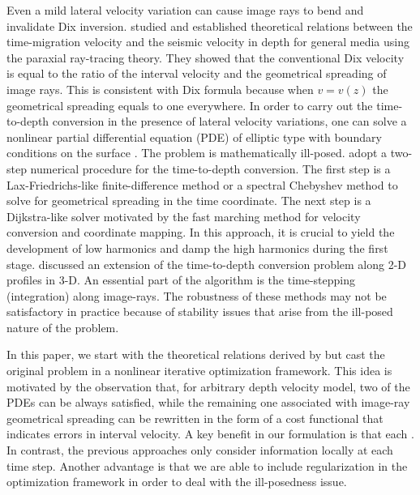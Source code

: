 Even a mild lateral velocity variation can cause image rays to bend and invalidate Dix inversion. 
\cite{cameron1,cameron2} studied and established theoretical relations between the time-migration velocity and the 
seismic velocity in depth for general media using the paraxial ray-tracing theory. They showed 
that\old{,} the conventional Dix velocity is equal to the ratio of the interval velocity and the 
geometrical spreading of image rays. This is consistent with Dix formula because when $v = v(z)$ the geometrical 
spreading equals to one everywhere. In order to carry out the time-to-depth conversion in the presence of lateral 
velocity variations, one can solve a nonlinear partial differential equation 
(PDE) of elliptic type with boundary conditions on the surface \cite[]{cameron3}. The problem is mathematically 
ill-posed. \cite{cameron3} adopt a two-step numerical procedure for the time-to-depth conversion. The first step 
is a Lax-Friedrichs-like finite-difference method or a spectral 
Chebyshev method to solve for geometrical spreading in the time coordinate. The next step is a Dijkstra-like solver 
motivated by the fast marching method \cite[]{sethian} for velocity conversion and coordinate mapping. In this 
approach, it is crucial to yield the development of low harmonics and damp the high harmonics during the first 
stage. \cite{iversen} discussed an extension of the time-to-depth conversion problem along 2-D profiles in 3-D. 
An essential part of the algorithm is the time-stepping (integration) along image-rays. The robustness of 
these methods may not be satisfactory in practice because of stability issues that arise from the ill-posed 
nature of the problem.

In this paper, we start with the theoretical relations derived by \cite{cameron1,cameron2} but cast the 
original problem in a nonlinear iterative optimization framework. This idea is motivated by the observation that, 
for arbitrary depth velocity model, two of the PDEs can be always satisfied, while the remaining one associated 
with image-ray geometrical spreading can be rewritten in the form of a cost functional that 
indicates errors in interval velocity. A key benefit in our formulation is that each 
. 
In contrast, the previous approaches only consider information locally at each time step. Another advantage 
is that we are able to include regularization in the optimization framework in order to deal with 
the ill-posedness issue.

